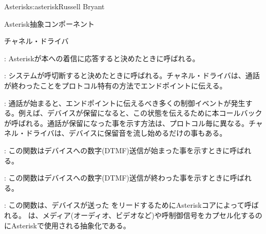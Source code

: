 \begin{aosachapter}{Asterisk}{s:asterisk}{Russell Bryant}
\begin{aosasect1}{Asterisk抽象コンポーネント}
\begin{aosasect2}{チャネル・ドライバ}
\begin{aosaitemize}
\item {}: Asteriskが本への着信に応答すると決めたときに呼ばれる。

\item {}: システムが呼切断すると決めたときに呼ばれる。チャネル・ドライバは、通話が終わったことをプロトコル特有の方法でエンドポイントに伝える。

\item {}: 通話が始まると、エンドポイントに伝えるべき多くの制御イベントが発生する。例えば、デバイスが保留になると、この状態を伝えるために本コールバックが呼ばれる。通話が保留になった事を示す方法は、プロトコル毎に異なる。チャネル・ドライバは、デバイスに保留音を流し始めるだけの事もある。

\item {}: この関数はデバイスへの数字(DTMF)送信が始まった事を示すときに呼ばれる。

\item {}: この関数はデバイスへの数字(DTMF)送信が終わった事を示すときに呼ばれる。

\item {}: この関数は、デバイスが送った をリードするためにAsteriskコアによって呼ばれる。 は、メディア(オーディオ、ビデオなど)や呼制御信号をカプセル化するのにAsteriskで使用される抽象化である。


\end{aosaitemize}
\end{aosasect2}
\end{aosasect1}
\end{aosachapter}
